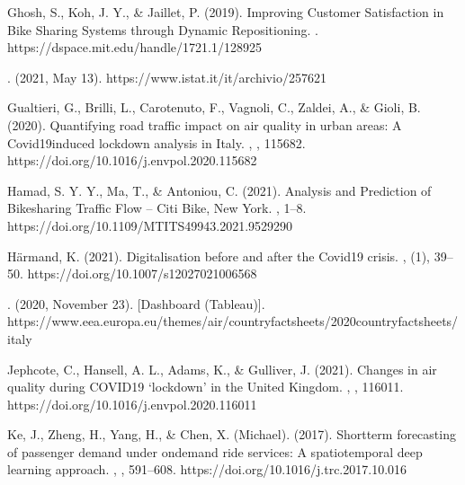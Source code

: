 \documentclass[letterpaper,10pt,english]{jupyterBook}
\begin{document}
\sphinxAtStartPar
Ghosh, S., Koh, J. Y., \& Jaillet, P. (2019). Improving Customer Satisfaction in Bike Sharing Systems through Dynamic Repositioning. . https://dspace.mit.edu/handle/1721.1/128925

\sphinxAtStartPar
{}. (2021, May 13). https://www.istat.it/it/archivio/257621

\sphinxAtStartPar
Gualtieri, G., Brilli, L., Carotenuto, F., Vagnoli, C., Zaldei, A., \& Gioli, B. (2020). Quantifying road traffic impact on air quality in urban areas: A Covid19\sphinxhyphen{}induced lockdown analysis in Italy. , , 115682. https://doi.org/10.1016/j.envpol.2020.115682

\sphinxAtStartPar
Hamad, S. Y. Y., Ma, T., \& Antoniou, C. (2021). Analysis and Prediction of Bikesharing Traffic Flow – Citi Bike, New York. , 1–8. https://doi.org/10.1109/MT\sphinxhyphen{}ITS49943.2021.9529290

\sphinxAtStartPar
Härmand, K. (2021). Digitalisation before and after the Covid\sphinxhyphen{}19 crisis. , (1), 39–50. https://doi.org/10.1007/s12027\sphinxhyphen{}021\sphinxhyphen{}00656\sphinxhyphen{}8

\sphinxAtStartPar
{}. (2020, November 23). {[}Dashboard (Tableau){]}. https://www.eea.europa.eu/themes/air/country\sphinxhyphen{}fact\sphinxhyphen{}sheets/2020\sphinxhyphen{}country\sphinxhyphen{}fact\sphinxhyphen{}sheets/italy

\sphinxAtStartPar
Jephcote, C., Hansell, A. L., Adams, K., \& Gulliver, J. (2021). Changes in air quality during COVID\sphinxhyphen{}19 ‘lockdown’ in the United Kingdom. , , 116011. https://doi.org/10.1016/j.envpol.2020.116011

\sphinxAtStartPar
Ke, J., Zheng, H., Yang, H., \& Chen, X. (Michael). (2017). Short\sphinxhyphen{}term forecasting of passenger demand under on\sphinxhyphen{}demand ride services: A spatio\sphinxhyphen{}temporal deep learning approach. , , 591–608. https://doi.org/10.1016/j.trc.2017.10.016
\end{document}
